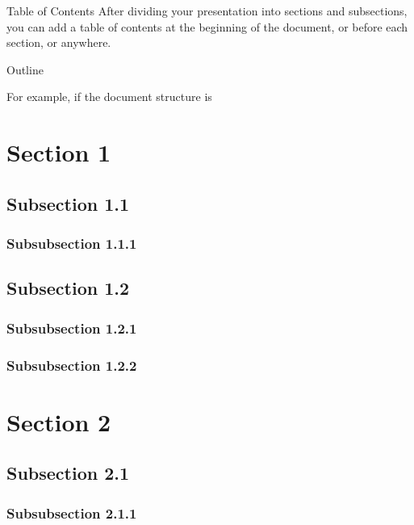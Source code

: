 \begin{fragileframe}{Table of Contents}
After dividing your presentation into sections and subsections, you can add a table of contents at the beginning of the document, or before each section, or anywhere. 

\begin{command}
\begin{LCL}
\begin{frame}{Outline}
  \tableofcontents[options]
\end{frame}
\end{LCL}
\end{command}

For example, if the document structure is
\begin{example}
\begin{multicols}{2}
\begin{LCL}
\section{Section 1}
\subsection{Subsection 1.1}
\subsubsection{Subsubsection 1.1.1}
\subsection{Subsection 1.2}
\subsubsection{Subsubsection 1.2.1}
\subsubsection{Subsubsection 1.2.2}
\section{Section 2}
\subsection{Subsection 2.1}
\subsubsection{Subsubsection 2.1.1}

\end{LCL}
\end{multicols}
\end{example}
\end{fragileframe}
